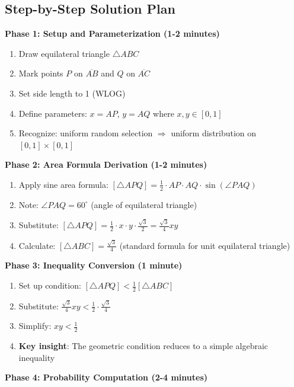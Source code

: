 \documentclass[11pt]{article}
\begin{document}
\begin{solutionbox}
\subsection*{Step-by-Step Solution Plan}

\textbf{Phase 1: Setup and Parameterization (1-2 minutes)}
\begin{enumerate}
    \item Draw equilateral triangle $\triangle ABC$
    \item Mark points $P$ on $\overline{AB}$ and $Q$ on $\overline{AC}$
    \item Set side length to 1 (WLOG)
    \item Define parameters: $x = AP$, $y = AQ$ where $x, y \in [0,1]$
    \item Recognize: uniform random selection $\Rightarrow$ uniform distribution on $[0,1] \times [0,1]$
\end{enumerate}

\textbf{Phase 2: Area Formula Derivation (1-2 minutes)}
\begin{enumerate}[resume]
    \item Apply sine area formula: $[\triangle APQ] = \frac{1}{2} \cdot AP \cdot AQ \cdot \sin(\angle PAQ)$
    \item Note: $\angle PAQ = 60^\circ$ (angle of equilateral triangle)
    \item Substitute: $[\triangle APQ] = \frac{1}{2} \cdot x \cdot y \cdot \frac{\sqrt{3}}{2} = \frac{\sqrt{3}}{4}xy$
    \item Calculate: $[\triangle ABC] = \frac{\sqrt{3}}{4}$ (standard formula for unit equilateral triangle)
\end{enumerate}

\textbf{Phase 3: Inequality Conversion (1 minute)}
\begin{enumerate}[resume]
    \item Set up condition: $[\triangle APQ] < \frac{1}{2}[\triangle ABC]$
    \item Substitute: $\frac{\sqrt{3}}{4}xy < \frac{1}{2} \cdot \frac{\sqrt{3}}{4}$
    \item Simplify: $xy < \frac{1}{2}$
    \item \textbf{Key insight}: The geometric condition reduces to a simple algebraic inequality
\end{enumerate}

\textbf{Phase 4: Probability Computation (2-4 minutes)}


\end{solutionbox}
\end{document}

